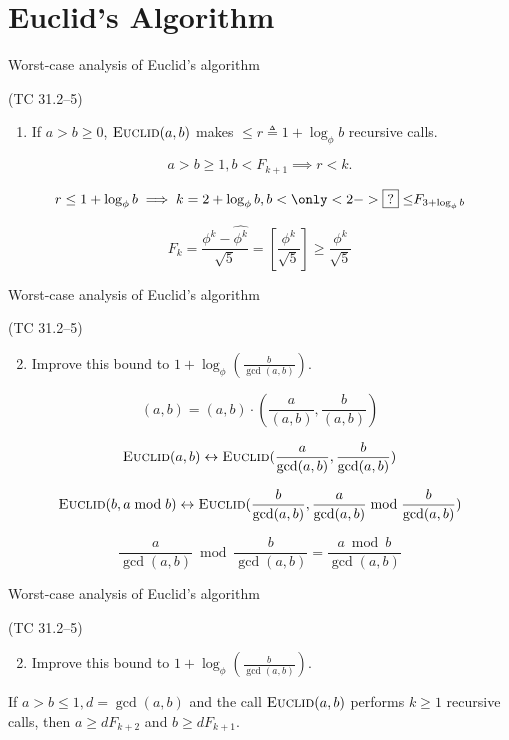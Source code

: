 \section{Euclid's Algorithm}

\begin{frame}{Worst-case analysis of Euclid's algorithm}
  \begin{exampleblock}{(TC 31.2--5)}
	\begin{enumerate}
	  \item If $a > b \ge 0$, $\textsc{Euclid}(a,b)$ makes $\le r \triangleq 1 + \log_{\phi}b$ recursive calls.
	\end{enumerate}
  \end{exampleblock}

  \[
	a > b \ge 1, b < F_{k+1} \implies r < k.
  \]

  \[
	r \le 1 + \log_{\phi}b \implies k = 2 + \log_{\phi}b, b < \only<2->{\boxed{?} \le} F_{3 + \log_{\phi}b}
  \]

  \[
	F_k = \frac{\phi^{k} - \hat{\phi^{k}}}{\sqrt{5}} = [\frac{\phi^{k}}{\sqrt{5}}] \ge \frac{\phi^{k}}{\sqrt{5}}
  \]
\end{frame}
\begin{frame}{Worst-case analysis of Euclid's algorithm}
  \begin{exampleblock}{(TC 31.2--5)}
	\begin{enumerate}
	  \setcounter{enumi}{1}
	  \item Improve this bound to $1 + \log_{\phi}(\frac{b}{\gcd(a,b)})$.
	\end{enumerate}
  \end{exampleblock}

  \[
	(a,b) = (a,b) \cdot (\frac{a}{(a,b)}, \frac{b}{(a,b)})
  \]

  \[
	\textsc{Euclid}(a,b) \leftrightarrow \textsc{Euclid}(\frac{a}{\gcd(a,b)}, \frac{b}{\gcd(a,b)})
  \]

  \[
	\textsc{Euclid}(b, a \bmod b) \leftrightarrow \textsc{Euclid}(\frac{b}{\gcd(a,b)}, \frac{a}{\gcd(a,b)} \bmod \frac{b}{\gcd(a,b)})
  \]

  \[
	\frac{a}{\gcd(a,b)} \bmod \frac{b}{\gcd(a,b)} = \frac{a \bmod b}{\gcd(a,b)}
  \]
\end{frame}
\begin{frame}{Worst-case analysis of Euclid's algorithm}
  \begin{exampleblock}{(TC 31.2--5)}
	\begin{enumerate}
	  \setcounter{enumi}{1}
	  \item Improve this bound to $1 + \log_{\phi}(\frac{b}{\gcd(a,b)})$.
	\end{enumerate}
  \end{exampleblock}

  \begin{Lemma}
	If $a > b \le 1, d = \gcd(a,b)$ and the call $\textsc{Euclid}(a,b)$ performs $k \ge 1$ recursive calls,
	then $a \ge dF_{k+2}$ and $b \ge dF_{k+1}$.
  \end{Lemma}
\end{frame}
